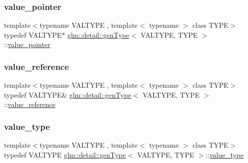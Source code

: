 \mbox{\label{structglm_1_1detail_1_1gen_type_a3b272e7be29ab920f2877c00646f6f9b}} 
\subsubsection{\texorpdfstring{value\+\_\+pointer}{value\_pointer}}
{\footnotesize\ttfamily template$<$typename V\+A\+L\+T\+Y\+PE , template$<$ typename $>$ class T\+Y\+PE$>$ \\
typedef V\+A\+L\+T\+Y\+PE$\ast$ \mbox{\hyperlink{structglm_1_1detail_1_1gen_type}{glm\+::detail\+::gen\+Type}}$<$ V\+A\+L\+T\+Y\+PE, T\+Y\+PE $>$\+::\mbox{\hyperlink{structglm_1_1detail_1_1gen_type_a3b272e7be29ab920f2877c00646f6f9b}{value\+\_\+pointer}}}

\mbox{\label{structglm_1_1detail_1_1gen_type_a557d18598a777df9f16fa1bd7c637ca4}} 
\subsubsection{\texorpdfstring{value\+\_\+reference}{value\_reference}}
{\footnotesize\ttfamily template$<$typename V\+A\+L\+T\+Y\+PE , template$<$ typename $>$ class T\+Y\+PE$>$ \\
typedef V\+A\+L\+T\+Y\+PE\& \mbox{\hyperlink{structglm_1_1detail_1_1gen_type}{glm\+::detail\+::gen\+Type}}$<$ V\+A\+L\+T\+Y\+PE, T\+Y\+PE $>$\+::\mbox{\hyperlink{structglm_1_1detail_1_1gen_type_a557d18598a777df9f16fa1bd7c637ca4}{value\+\_\+reference}}}

\mbox{\label{structglm_1_1detail_1_1gen_type_ad59e126a45bca74a36732a30cdaee520}} 
\subsubsection{\texorpdfstring{value\+\_\+type}{value\_type}}
{\footnotesize\ttfamily template$<$typename V\+A\+L\+T\+Y\+PE , template$<$ typename $>$ class T\+Y\+PE$>$ \\
typedef V\+A\+L\+T\+Y\+PE \mbox{\hyperlink{structglm_1_1detail_1_1gen_type}{glm\+::detail\+::gen\+Type}}$<$ V\+A\+L\+T\+Y\+PE, T\+Y\+PE $>$\+::\mbox{\hyperlink{structglm_1_1detail_1_1gen_type_ad59e126a45bca74a36732a30cdaee520}{value\+\_\+type}}}



